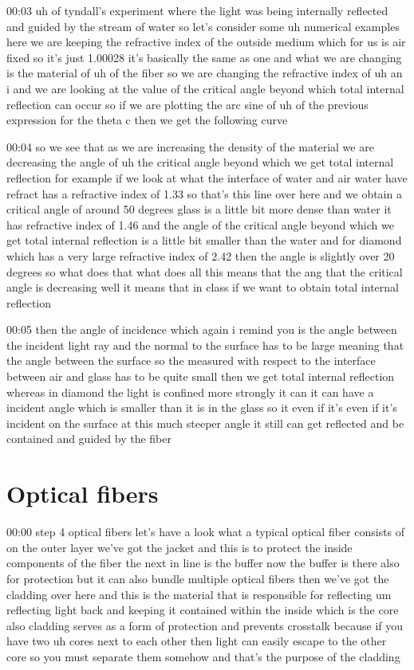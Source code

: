00:03
uh of tyndall's experiment where the light was being internally reflected and
guided by the stream of water so let's consider some uh numerical examples
here we are keeping the refractive index of the outside medium which for us
is air fixed so it's just 1.00028 it's basically the same as one
and what we are changing is the material of
uh of the fiber so we are changing the refractive index of uh an i
and we are looking at the value of the critical
angle beyond which total internal reflection can occur
so if we are plotting the arc sine of uh
of the previous expression for the theta c then we get the following curve

00:04
so we see that as we are increasing the density of the material we are
decreasing the angle of uh the critical angle beyond which we get total internal
reflection for example if we look at what the interface of water and air
water have refract has a refractive index of 1.33
so that's this line over here and we obtain
a critical angle of around 50 degrees glass is a little bit more dense than
water it has refractive index of 1.46 and the angle of the critical angle
beyond which we get total internal reflection
is a little bit smaller than the water and for diamond which
has a very large refractive index of 2.42 then the angle
is slightly over 20 degrees so what does that
what does all this means that the ang that the critical angle is decreasing
well it means that in class if we want to obtain total internal reflection

00:05
then the angle of incidence which again i remind you is the angle between the
incident light ray and the normal to the surface
has to be large meaning that the angle between the surface
so the measured with respect to the interface between air and glass
has to be quite small then we get total internal reflection
whereas in diamond the light is confined more strongly it can
it can have a incident angle which is smaller than it is in the glass
so it even if it's even if it's incident on the surface at
this much steeper angle it still can get reflected and be contained and guided
by the fiber

\section{Optical fibers}

00:00
step 4 optical fibers let's have a look what a typical optical
fiber consists of on the outer layer we've got the jacket
and this is to protect the inside components of the fiber the next in line
is the buffer now the buffer is there also for protection
but it can also bundle multiple optical fibers
then we've got the cladding over here and this is the material that is
responsible for reflecting um reflecting light back and keeping it
contained within the inside which is the core also cladding
serves as a form of protection and prevents crosstalk because if you have
two uh cores next to each other then light can easily escape to the other core
so you must separate them somehow and that's the purpose of the cladding

